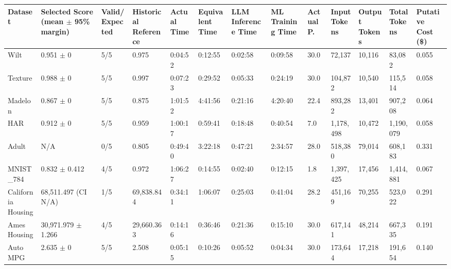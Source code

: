 \begin{tabular}{lllllllllllll}
\hline
Dataset & Selected Score (mean \ensuremath{\pm} 95\% margin) & Valid/Expected & Historical Reference & Actual Time & Equivalent Time & LLM Inference Time & ML Training Time & Actual P. & Input Tokens & Output Tokens & Total Tokens & Putative Cost (\$) \\
\hline
Wilt & 0.951 \ensuremath{\pm} 0 & 5/5 & 0.975 & 0:04:52 & 0:12:55 & 0:02:58 & 0:09:58 & 30.0 & 72,137 & 10,116 & 83,082 & 0.055 \\
Texture & 0.988 \ensuremath{\pm} 0 & 5/5 & 0.997 & 0:07:23 & 0:29:52 & 0:05:33 & 0:24:19 & 30.0 & 104,872 & 10,540 & 115,514 & 0.058 \\
Madelon & 0.867 \ensuremath{\pm} 0 & 5/5 & 0.875 & 1:01:52 & 4:41:56 & 0:21:16 & 4:20:40 & 22.4 & 893,282 & 13,401 & 907,208 & 0.064 \\
HAR & 0.912 \ensuremath{\pm} 0 & 5/5 & 0.959 & 1:00:17 & 0:59:41 & 0:18:48 & 0:40:54 & 7.0 & 1,178,498 & 10,472 & 1,190,079 & 0.058 \\
Adult & N/A & 0/5 & 0.805 & 0:49:40 & 3:22:18 & 0:47:21 & 2:34:57 & 28.0 & 518,380 & 79,014 & 608,183 & 0.331 \\
MNIST\_784 & 0.832 \ensuremath{\pm} 0.412 & 4/5 & 0.972 & 1:06:27 & 0:14:55 & 0:02:40 & 0:12:15 & 1.8 & 1,397,425 & 17,456 & 1,414,881 & 0.067 \\
California Housing & 68,511.497 (CI N/A) & 1/5 & 69,838.844 & 0:34:11 & 1:06:07 & 0:25:03 & 0:41:04 & 28.2 & 451,169 & 70,255 & 523,022 & 0.291 \\
Ames Housing & 30,971.979 \ensuremath{\pm} 1.266 & 4/5 & 29,660.363 & 0:14:16 & 0:36:46 & 0:21:36 & 0:15:10 & 30.0 & 617,141 & 48,214 & 667,335 & 0.191 \\
Auto MPG & 2.635 \ensuremath{\pm} 0 & 5/5 & 2.508 & 0:05:15 & 0:10:26 & 0:05:52 & 0:04:34 & 30.0 & 173,644 & 17,218 & 191,654 & 0.140 \\
\hline
\end{tabular}
